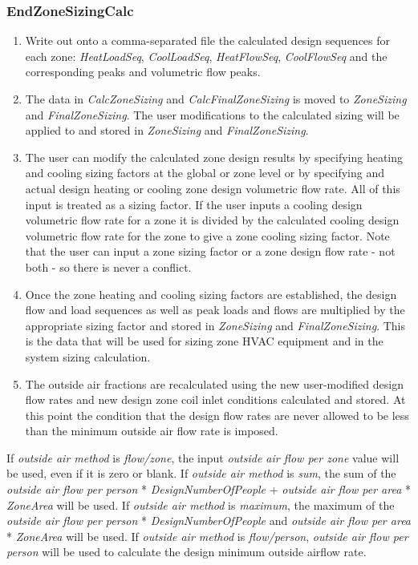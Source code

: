 \subsubsection{EndZoneSizingCalc}\label{endzonesizingcalc}

\begin{enumerate}
\def\labelenumi{(\arabic{enumi})}
\item
  Write out onto a comma-separated file the calculated design sequences for each zone: \emph{HeatLoadSeq}, \emph{CoolLoadSeq}, \emph{HeatFlowSeq}, \emph{CoolFlowSeq} and the corresponding peaks and volumetric flow peaks.
\item
  The data in \emph{CalcZoneSizing} and \emph{CalcFinalZoneSizing} is moved to \emph{ZoneSizing} and \emph{FinalZoneSizing}. The user modifications to the calculated sizing will be applied to and stored in \emph{ZoneSizing} and \emph{FinalZoneSizing}.
\item
  The user can modify the calculated zone design results by specifying heating and cooling sizing factors at the global or zone level or by specifying and actual design heating or cooling zone design volumetric flow rate. All of this input is treated as a sizing factor. If the user inputs a cooling design volumetric flow rate for a zone it is divided by the calculated cooling design volumetric flow rate for the zone to give a zone cooling sizing factor. Note that the user can input a zone sizing factor or a zone design flow rate - not both - so there is never a conflict.
\item
  Once the zone heating and cooling sizing factors are established, the design flow and load sequences as well as peak loads and flows are multiplied by the appropriate sizing factor and stored in \emph{ZoneSizing} and \emph{FinalZoneSizing}. This is the data that will be used for sizing zone HVAC equipment and in the system sizing calculation.
\item
  The outside air fractions are recalculated using the new user-modified design flow rates and new design zone coil inlet conditions calculated and stored. At this point the condition that the design flow rates are never allowed to be less than the minimum outside air flow rate is imposed.
\end{enumerate}

If \emph{outside air method} is \emph{flow/zone}, the input \emph{outside air flow per zone} value will be used, even if it is zero or blank. If \emph{outside air method} is \emph{sum}, the sum of the \emph{outside air flow per person} * \emph{DesignNumberOfPeople} + \emph{outside air flow per area} * \emph{ZoneArea} will be used. If \emph{outside air method} is \emph{maximum}, the maximum of the \emph{outside air flow per person} * \emph{DesignNumberOfPeople} and \emph{outside air flow per area} * \emph{ZoneArea} will be used. If \emph{outside air method} is \emph{flow/person}, \emph{outside air flow per person} will be used to calculate the design minimum outside airflow rate.

